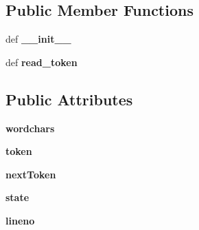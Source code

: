 \subsection*{Public Member Functions}
\begin{DoxyCompactItemize}
\item 
\hypertarget{classcheshire3_1_1cql_parser_1_1_c_q_lshlex_aeeb9c45ba63639c82786b807cec6d0dd}{def {\bfseries \-\_\-\-\_\-init\-\_\-\-\_\-}}\label{classcheshire3_1_1cql_parser_1_1_c_q_lshlex_aeeb9c45ba63639c82786b807cec6d0dd}

\item 
\hypertarget{classcheshire3_1_1cql_parser_1_1_c_q_lshlex_a528ccc23377ff3f28fb8e6a440774531}{def {\bfseries read\-\_\-token}}\label{classcheshire3_1_1cql_parser_1_1_c_q_lshlex_a528ccc23377ff3f28fb8e6a440774531}

\end{DoxyCompactItemize}
\subsection*{Public Attributes}
\begin{DoxyCompactItemize}
\item 
\hypertarget{classcheshire3_1_1cql_parser_1_1_c_q_lshlex_a9732bcb2527cc0d4c96cd62e8f224e76}{{\bfseries wordchars}}\label{classcheshire3_1_1cql_parser_1_1_c_q_lshlex_a9732bcb2527cc0d4c96cd62e8f224e76}

\item 
\hypertarget{classcheshire3_1_1cql_parser_1_1_c_q_lshlex_a52fd1351fee82d6b7fc7d93bc76e2504}{{\bfseries token}}\label{classcheshire3_1_1cql_parser_1_1_c_q_lshlex_a52fd1351fee82d6b7fc7d93bc76e2504}

\item 
\hypertarget{classcheshire3_1_1cql_parser_1_1_c_q_lshlex_a5787948db768d2455be3ba8337ea25d2}{{\bfseries next\-Token}}\label{classcheshire3_1_1cql_parser_1_1_c_q_lshlex_a5787948db768d2455be3ba8337ea25d2}

\item 
\hypertarget{classcheshire3_1_1cql_parser_1_1_c_q_lshlex_a367a980c25b65e0ff170b4e1715c53bb}{{\bfseries state}}\label{classcheshire3_1_1cql_parser_1_1_c_q_lshlex_a367a980c25b65e0ff170b4e1715c53bb}

\item 
\hypertarget{classcheshire3_1_1cql_parser_1_1_c_q_lshlex_a613c536e88996d68242cc4ef30f6ff3d}{{\bfseries lineno}}\label{classcheshire3_1_1cql_parser_1_1_c_q_lshlex_a613c536e88996d68242cc4ef30f6ff3d}

\end{DoxyCompactItemize}
